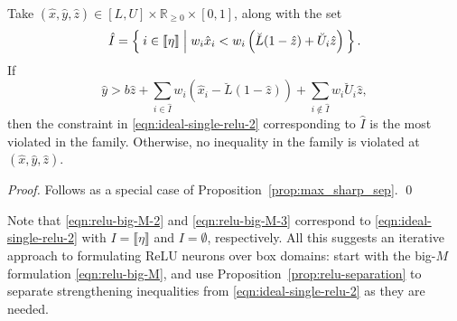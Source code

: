 \documentclass[smallextended]{svjour3}
\newcommand{\bbR}{\mathbb{R}}
\newcommand{\supp}{\operatorname{supp}}
\begin{document}
\begin{proposition} \label{prop:relu-separation}
    Take $(\hat{x},\hat{y},\hat{z}) \in [L,U] \times \bbR_{\geq 0} \times [0,1]$, along with the set
    \[
        \hat{I} = \Set{ i \in \llbracket\eta\rrbracket | w_i\hat{x}_i < w_i\left(\breve{L}(1-\hat{z}) + \breve{U}_i\hat{z}\right) }.
    \]
    If
    \[
        \hat{y} > b\hat{z} + \sum_{i \in \hat{I}} w_i\left(\hat{x}_i - \breve{L}(1-\hat{z})\right) + \sum_{i \not\in \hat{I}} w_i\breve{U}_i\hat{z},
    \]
    then the constraint in \eqref{eqn:ideal-single-relu-2} corresponding to $\hat{I}$ is the most violated in the family. Otherwise, no inequality in the family is violated at $(\hat{x},\hat{y},\hat{z})$.
\end{proposition}
\begin{proof}
Follows as a special case of Proposition~\ref{prop:max_sharp_sep}.
\qed \end{proof}

Note that \eqref{eqn:relu-big-M-2} and \eqref{eqn:relu-big-M-3} correspond to \eqref{eqn:ideal-single-relu-2} with $I = \llbracket\eta\rrbracket$ and $I = \emptyset$, respectively. All this suggests an iterative approach to formulating ReLU neurons over box domains: start with the big-$M$ formulation \eqref{eqn:relu-big-M}, and use Proposition~\ref{prop:relu-separation} to separate strengthening inequalities from \eqref{eqn:ideal-single-relu-2} as they are needed.

\end{document}
